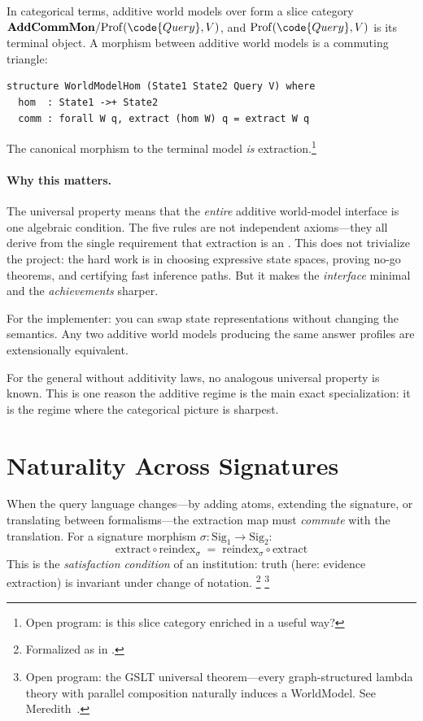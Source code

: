 \documentclass[11pt,openany]{report}
\begin{document}
In categorical terms, additive world models over  form a
slice category $\mathbf{AddCommMon} / \mathrm{Prof}(\code{Query}, V)$,
and $\mathrm{Prof}(\code{Query}, V)$ is its terminal object.  A
morphism between additive world models is a commuting triangle:

\begin{lstlisting}[language={}]
structure WorldModelHom (State1 State2 Query V) where
  hom  : State1 ->+ State2
  comm : forall W q, extract (hom W) q = extract W q
\end{lstlisting}

\noindent
The canonical morphism to the terminal model \emph{is}
extraction.\footnote{Open program: is this slice category enriched
in a useful way?}

\paragraph{Why this matters.}
The universal property means that the \emph{entire} additive
world-model interface is one algebraic condition.  The five rules
are not independent axioms---they all derive from the single
requirement that extraction is an .  This does
not trivialize the project: the hard work is in choosing expressive
state spaces, proving no-go theorems, and certifying fast inference
paths.  But it makes the \emph{interface} minimal and the
\emph{achievements} sharper.

For the implementer: you can swap state representations without
changing the semantics.  Any two additive world models producing the
same answer profiles are extensionally equivalent.

For the general  without additivity laws, no
analogous universal property is known.  This is one reason the additive
regime is the main exact specialization: it is the regime where the
categorical picture is sharpest.


\section{Naturality Across Signatures}
\label{sec:naturality}

When the query language changes---by adding atoms, extending the
signature, or translating between formalisms---the extraction map
must \emph{commute} with the translation.  For a signature morphism
$\sigma : \mathrm{Sig}_1 \to \mathrm{Sig}_2$:
\[
  \mathrm{extract} \circ \mathrm{reindex}_\sigma
  \;=\;
  \mathrm{reindex}_\sigma \circ \mathrm{extract}
\]
This is the \emph{satisfaction condition} of an institution: truth
(here: evidence extraction) is invariant under change of
notation.%
\footnote{Formalized as
 in
.}
\footnote{Open program: the GSLT universal theorem---every
graph-structured lambda theory with parallel composition naturally
induces a WorldModel.  See Meredith~\cite{meredith2026ccc}.}
\end{document}
